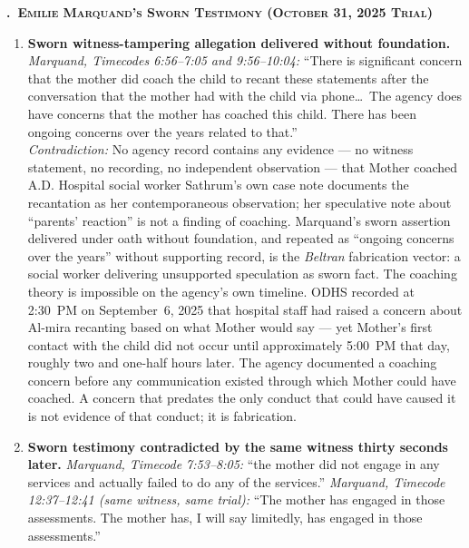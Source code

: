 \documentclass[10pt,a4paper,roman]{moderncv}
\newcounter{legalsection}
\newcounter{legalsubsection}[legalsection]
\renewcommand{\thelegalsubsection}{\Alph{legalsubsection}}
\newcommand{\legalsubsection}[1]{%
	\refstepcounter{legalsubsection}%
	\par\addvspace{0.85em}%
	{\color{inkblue}\normalfont\normalsize\bfseries\scshape
		\thelegalsubsection.\hspace{0.45em}#1\par}%
	\vspace{0.2em}%
}
\begin{document}
\begin{enumerate}[leftmargin=*,itemsep=0.35em,topsep=0.3em,resume]
\legalsubsection{~Emilie Marquand's Sworn Testimony (October 31, 2025 Trial)}

\begin{enumerate}[leftmargin=*,itemsep=0.35em,topsep=0.3em,resume]
	\item \textbf{Sworn witness-tampering allegation delivered without foundation.} \emph{Marquand, Timecodes 6:56--7:05 and 9:56--10:04:} ``There is significant concern that the mother did coach the child to recant these statements after the conversation that the mother had with the child via phone\ldots\ The agency does have concerns that the mother has coached this child. There has been ongoing concerns over the years related to that.''\\
	
	\emph{Contradiction:} No agency record contains any evidence --- no witness statement, no recording, no independent observation --- that Mother coached A.D. Hospital social worker Sathrum's own case note documents the recantation as her contemporaneous observation; her speculative note about ``parents' reaction'' is not a finding of coaching. Marquand's sworn assertion delivered under oath without foundation, and repeated as ``ongoing concerns over the years'' without supporting record, is the \emph{Beltran} fabrication vector: a social worker delivering unsupported speculation as sworn fact. The coaching theory is impossible on the agency's own timeline. ODHS recorded at 2:30~PM on September~6, 2025 that hospital staff had raised a concern about Al-mira recanting based on what Mother would say --- yet Mother's first contact with the child did not occur until approximately 5:00~PM that day, roughly two and one-half hours later. The agency documented a coaching concern before any communication existed through which Mother could have coached. A concern that predates the only conduct that could have caused it is not evidence of that conduct; it is fabrication.%
	
	\item \textbf{Sworn testimony contradicted by the same witness thirty seconds later.} \emph{Marquand, Timecode 7:53--8:05:} ``the mother did not engage in any services and actually failed to do any of the services.'' \emph{Marquand, Timecode 12:37--12:41 (same witness, same trial):} ``The mother has engaged in those assessments. The mother has, I will say limitedly, has engaged in those assessments.''
	

\end{enumerate}
\end{enumerate}
\end{document}
